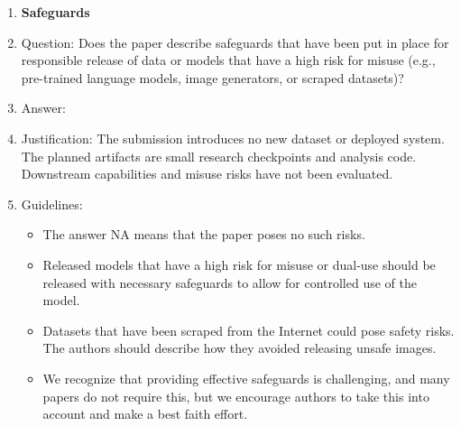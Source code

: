 \begin{enumerate}
\item {\bf Safeguards}
    \item[] Question: Does the paper describe safeguards that have been put in place for responsible release of data or models that have a high risk for misuse (e.g., pre-trained language models, image generators, or scraped datasets)?
    \item[] Answer: \answerNA{}
    \item[] Justification: The submission introduces no new dataset or deployed system. The planned artifacts are small research checkpoints and analysis code. Downstream capabilities and misuse risks have not been evaluated.
    \item[] Guidelines:
    \begin{itemize}
        \item The answer NA means that the paper poses no such risks.
        \item Released models that have a high risk for misuse or dual-use should be released with necessary safeguards to allow for controlled use of the model.
        \item Datasets that have been scraped from the Internet could pose safety risks. The authors should describe how they avoided releasing unsafe images.
        \item We recognize that providing effective safeguards is challenging, and many papers do not require this, but we encourage authors to take this into account and make a best faith effort.
    \end{itemize}


\end{enumerate}
